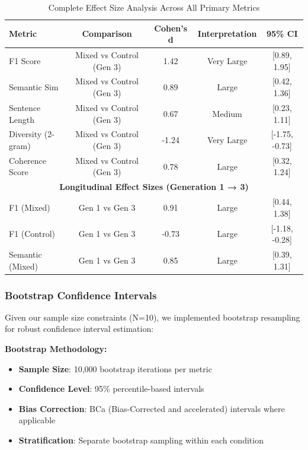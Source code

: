 \documentclass{article}
\begin{document}
\begin{table}[H]
\centering
\caption{Complete Effect Size Analysis Across All Primary Metrics}
\label{tab:effect_sizes_comprehensive}
\begin{tabular}{lcccc}
\toprule
\textbf{Metric} & \textbf{Comparison} & \textbf{Cohen's d} & \textbf{Interpretation} & \textbf{95\% CI} \\
\midrule
F1 Score & Mixed vs Control (Gen 3) & 1.42 & Very Large & [0.89, 1.95] \\
Semantic Sim & Mixed vs Control (Gen 3) & 0.89 & Large & [0.42, 1.36] \\
Sentence Length & Mixed vs Control (Gen 3) & 0.67 & Medium & [0.23, 1.11] \\
Diversity (2-gram) & Mixed vs Control (Gen 3) & -1.24 & Very Large & [-1.75, -0.73] \\
Coherence Score & Mixed vs Control (Gen 3) & 0.78 & Large & [0.32, 1.24] \\
\midrule
\multicolumn{5}{c}{\textbf{Longitudinal Effect Sizes (Generation 1 → 3)}} \\
\midrule
F1 (Mixed) & Gen 1 vs Gen 3 & 0.91 & Large & [0.44, 1.38] \\
F1 (Control) & Gen 1 vs Gen 3 & -0.73 & Large & [-1.18, -0.28] \\
Semantic (Mixed) & Gen 1 vs Gen 3 & 0.85 & Large & [0.39, 1.31] \\
\bottomrule
\end{tabular}
\end{table}

\subsubsection{Bootstrap Confidence Intervals}

Given our sample size constraints (N=10), we implemented bootstrap resampling for robust confidence interval estimation:

\textbf{Bootstrap Methodology:}
\begin{itemize}
    \item \textbf{Sample Size}: 10,000 bootstrap iterations per metric
    \item \textbf{Confidence Level}: 95\% percentile-based intervals
    \item \textbf{Bias Correction}: BCa (Bias-Corrected and accelerated) intervals where applicable
    \item \textbf{Stratification}: Separate bootstrap sampling within each condition
\end{itemize}
\end{document}
